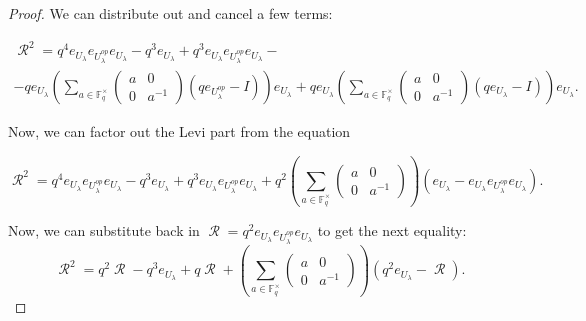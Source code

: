 \documentclass[12pt,reqno]{amsart}
\theoremstyle{definition}
\theoremstyle{remark}
\numberwithin{equation}{section}
\DeclareMathOperator{\R}{\mathcal{R}}
\begin{document}
\begin{proof}
We can distribute out and cancel a few terms:%

\begin{multline*}
    \R^2 =  q^4e_{U_{\lambda}}e_{U_{\lambda}^{op}}e_{U_{\lambda}} - q^3 e_{U_{\lambda}} + q^3e_{U_{\lambda}}e_{U_{\lambda}^{op}}e_{U_{\lambda}} -\\- qe_{U_{\lambda}} \left( \sum_{a \in \mathbb{F}_q^\times} \begin{pmatrix}
    a & 0 \\
    0 & a^{-1}
    \end{pmatrix} (qe_{U_{\lambda}^{op}} - I)\right) e_{U_{\lambda}}+
     qe_{U_{\lambda}} \left(  \sum_{a \in \mathbb{F}_q^\times} \begin{pmatrix}
    a & 0 \\
    0 & a^{-1}
    \end{pmatrix} (qe_{U_{\lambda}} - I) \right) e_{U_{\lambda}}.
\end{multline*}

Now, we can factor out the Levi part from the equation

\begin{equation*}
     \R^2=  q^4e_{U_{\lambda}}e_{U_{\lambda}^{op}}e_{U_{\lambda}} - q^3 e_{U_{\lambda}} + q^3e_{U_{\lambda}}e_{U_{\lambda}^{op}}e_{U_{\lambda}} + q^2\left(  \sum_{a \in \mathbb{F}_q^\times} \begin{pmatrix}
    a & 0 \\
    0 & a^{-1}
    \end{pmatrix} \right) ( e_{U_{\lambda}} - e_{U_{\lambda}}e_{U_{\lambda}^{op}}e_{U_{\lambda}}).
\end{equation*}

Now, we can substitute back in $\R = q^2e_{U_{\lambda}}e_{U_{\lambda}^{op}}e_{U_{\lambda}}$ to get the next equality:
\begin{equation*}
    \R^2 =  q^2 \R - q^3 e_{U_{\lambda}} + q \R + \left(  \sum_{a \in \mathbb{F}_q^\times} \begin{pmatrix}
    a & 0 \\
    0 & a^{-1}
    \end{pmatrix} \right) ( q^2 e_{U_{\lambda}} - \R).
\end{equation*}


\end{proof}
\end{document}
